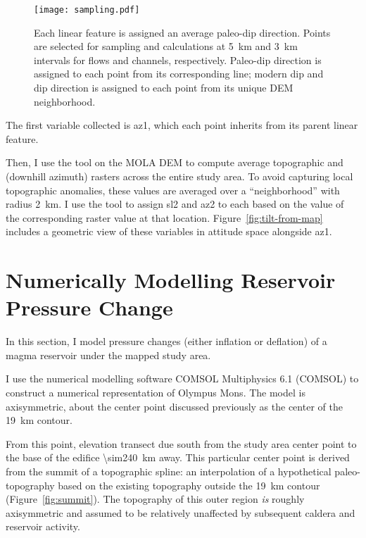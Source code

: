 \begin{figure}
    \centering
    \texttt{[image: sampling.pdf]}
    \caption[Sampling site selection]{Each linear feature is assigned an average paleo-dip direction. Points are selected for sampling and calculations at \qty{5}{\km} and \qty{3}{\km} intervals for flows and channels, respectively. Paleo-dip direction is assigned to each point from its corresponding line; modern dip and dip direction is assigned to each point from its unique \ac{DEM} neighborhood.}%
    \label{fig:sampling}
\end{figure}

\newcommand{\neighborhood}{\qty{2}{\km}}

The first variable collected is \ac{az1}, which each point inherits from its parent linear feature.

Then, I use the  tool on the \ac{MOLA} \ac{DEM} to compute average topographic  and  (downhill azimuth) rasters across the entire study area. To avoid capturing local topographic anomalies, these values are averaged over a ``neighborhood'' with radius \neighborhood. I use the  tool to assign \ac{sl2} and \ac{az2} to each based on the value of the corresponding raster value at that location. Figure~\ref{fig:tilt-from-map} includes a geometric view of these variables in attitude space alongside \acs{az1}.

\section{Numerically Modelling Reservoir Pressure Change}\label{sec:modelling}

In this section, I model pressure changes (either inflation or deflation) of a magma reservoir under the mapped study area.

I use the numerical modelling software COMSOL Multiphysics 6.1 (COMSOL) to construct a numerical representation of Olympus Mons. The model is axisymmetric, about the center point discussed previously as the center of the \qty{19}{\km} contour.

From this point, elevation transect due south from the study area center point to the base of the edifice \qty{\sim240}{\km} away. This particular center point is derived from the summit of a topographic spline: an interpolation of a hypothetical paleo-topography based on the existing topography outside the \qty{19}{\km} contour (Figure~\ref{fig:summit}). The topography of this outer region \emph{is} roughly axisymmetric and assumed to be relatively unaffected by subsequent caldera and reservoir activity.

